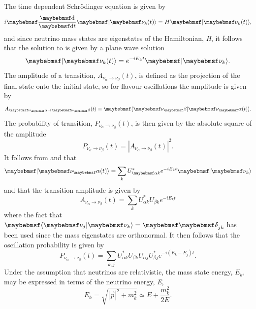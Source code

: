 The time dependent Schr{\"o}dinger equation is given by
\begin{equation} \label{eqn:t.d. schrodinger}
    i \dByd{}{t}\ket{\nu_{k}(t)} = H \ket{\nu_{k}(t)},
\end{equation}
and since neutrino mass states are eigenstates of the Hamiltonian, \textit{H},  it follows that the solution to  is given by a plane wave solution 
\begin{equation}\label{eqn:plane wave soln}
    \ket{\nu_{k}(t)} = e^{-iE_{k}t} \ket{\nu_{k}}.
\end{equation}
The amplitude of a transition, $A_{\nu_\alpha \rightarrow \nu_\beta}(t)$, is defined as the projection of the final state onto the initial state, so for flavour oscillations the amplitude is given by
\begin{equation}
    A_{\nu_\alpha \rightarrow \nu_\beta}(t) \isdefinedas \braket{\nu_\beta|\nu_\alpha(t)}.
\end{equation}
The probability of transition, $P_{\nu_\alpha \rightarrow \nu_\beta}(t)$, is then given by the absolute square of the amplitude
\begin{equation}
    P_{\nu_\alpha \rightarrow \nu_\beta}(t) = |A_{\nu_\alpha \rightarrow \nu_\beta}(t)|^2.
\end{equation}
It follows from  and  that
\begin{equation}
    \ket{\nu_\alpha(t)} = \sum_k U^*_{\alpha k} e^{-iE_kt}\ket{\nu_k}
\end{equation}
and that the transition amplitude is given by
\begin{equation}
    A_{\nu_\alpha \rightarrow \nu_\beta}(t) = \sum_k U^*_{\alpha k} U_{\beta k} e^{-iE_kt}
\end{equation}
where the fact that $\braket{\nu_j|\nu_k} = \Kronecker_{jk}$ has been used since the mass eigenstates are orthonormal. It then follows that the oscillation probability is given by
\begin{equation}
    P_{\nu_\alpha \rightarrow \nu_\beta}(t) = \sum_{k,j} U^*_{\alpha k} U_{\beta k} U_{\alpha j} U^*_{\beta j} e^{-i(E_k-E_j)t}.
\end{equation}
Under the assumption that neutrinos are relativistic, the mass state energy, $E_k$, may be expressed in terms of the neutrino energy, \textit{E},
\begin{equation}
    E_k = \sqrt{|\Vec{p}|^2 + m_k^2} \simeq E + \frac{m_k^2}{2E}.
\end{equation}
